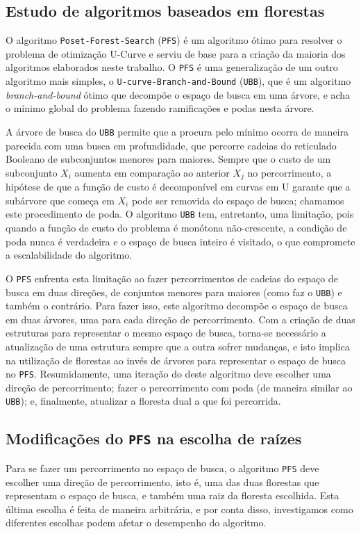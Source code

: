 \documentclass[12pt]{article}
\newcommand{\foreignword}[1]{\textit{#1}}
\newcommand{\algname}[1]{\texttt{#1}}
\begin{document}
\subsection{Estudo de algoritmos baseados em florestas}
\label{sec:pfs_studies}
O algoritmo \algname{Poset\--Forest\--Search} (\algname{PFS}) é um 
algoritmo ótimo para resolver o problema de otimização U-Curve e serviu 
de base para a criação da maioria dos algoritmos elaborados neste 
trabalho. O \algname{PFS} é uma generalização de um outro algoritmo mais
simples, o \algname{U-curve-Branch-and-Bound} (\algname{UBB}), que é
um algoritmo \foreignword{branch-and-bound} ótimo que decompõe o espaço
de busca em uma árvore, e acha o mínimo global do problema fazendo 
ramificações e podas nesta árvore.

A árvore de busca do \algname{UBB} permite que a procura pelo mínimo 
ocorra de maneira parecida com uma busca em profundidade, que percorre
cadeias do reticulado Booleano de subconjuntos menores para maiores. 
Sempre que o custo de um subconjunto $X_i$ aumenta em comparação ao 
anterior $X_j$ no percorrimento, a hipótese de que a função de custo é 
decomponível em curvas em U garante que a subárvore que começa em $X_i$
pode ser removida do espaço de busca; chamamos este procedimento de
poda. O algoritmo \algname{UBB} tem, entretanto, uma limitação, pois
quando a função de custo do problema é monótona não-crescente, a 
condição de poda nunca é verdadeira e o espaço de busca inteiro é 
visitado, o que compromete a escalabilidade do algoritmo.

O \algname{PFS} enfrenta esta limitação ao fazer percorrimentos de
cadeias do espaço de busca em duas direções, de conjuntos menores para
maiores (como faz o \algname{UBB}) e também o contrário. Para fazer 
isso, este algoritmo decompõe o espaço de busca em duas árvores, uma 
para cada direção de percorrimento. Com a criação de duas estruturas 
para representar o mesmo espaço de busca, torna-se necessário a 
atualização de uma estrutura sempre que a outra sofrer mudanças, e isto
implica na utilização de florestas ao invés de árvores para representar
o espaço de busca no \algname{PFS}. Resumidamente, uma iteração do 
deste algoritmo deve escolher uma direção de percorrimento; fazer o 
percorrimento com poda (de maneira similar ao \algname{UBB}); e, 
finalmente, atualizar a floresta dual a que foi percorrida.


\subsection{Modificações do \algname{PFS} na escolha de raízes}
\label{sec:pfs_root_choice}
Para se fazer um percorrimento no espaço de busca, o algoritmo 
\algname{PFS} deve escolher uma direção de percorrimento, isto é, uma
das duas florestas que representam o espaço de busca, e também uma raiz
da floresta escolhida. Esta última escolha é feita de maneira 
arbitrária, e por conta disso, investigamos como diferentes escolhas 
podem afetar o desempenho do algoritmo.
\end{document}
